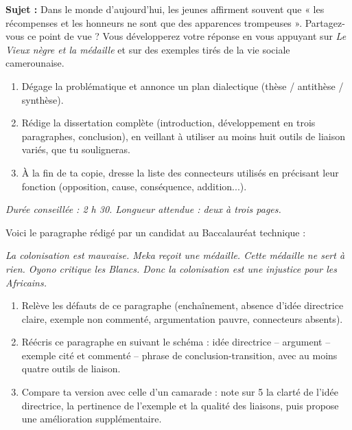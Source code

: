 \documentclass[11pt]{article}
\begin{document}
\begin{exercice}
\textbf{Sujet :} Dans le monde d'aujourd'hui, les jeunes affirment souvent que « les récompenses et les honneurs ne sont que des apparences trompeuses ». Partagez-vous ce point de vue ? Vous développerez votre réponse en vous appuyant sur \emph{Le Vieux nègre et la médaille} et sur des exemples tirés de la vie sociale camerounaise.

\begin{enumerate}
\item Dégage la problématique et annonce un plan dialectique (thèse / antithèse / synthèse).
\item Rédige la dissertation complète (introduction, développement en trois paragraphes, conclusion), en veillant à utiliser au moins huit outils de liaison variés, que tu souligneras.
\item À la fin de ta copie, dresse la liste des connecteurs utilisés en précisant leur fonction (opposition, cause, conséquence, addition...).
\end{enumerate}
\emph{Durée conseillée : 2 h 30. Longueur attendue : deux à trois pages.}
\end{exercice}

\begin{exercice}
Voici le paragraphe rédigé par un candidat au Baccalauréat technique :

\emph{La colonisation est mauvaise. Meka reçoit une médaille. Cette médaille ne sert à rien. Oyono critique les Blancs. Donc la colonisation est une injustice pour les Africains.}

\begin{enumerate}
\item Relève les défauts de ce paragraphe (enchaînement, absence d'idée directrice claire, exemple non commenté, argumentation pauvre, connecteurs absents).
\item Réécris ce paragraphe en suivant le schéma : idée directrice -- argument -- exemple cité et commenté -- phrase de conclusion-transition, avec au moins quatre outils de liaison.
\item Compare ta version avec celle d'un camarade : note sur 5 la clarté de l'idée directrice, la pertinence de l'exemple et la qualité des liaisons, puis propose une amélioration supplémentaire.
\end{enumerate}
\end{exercice}

\newpage
\end{document}
